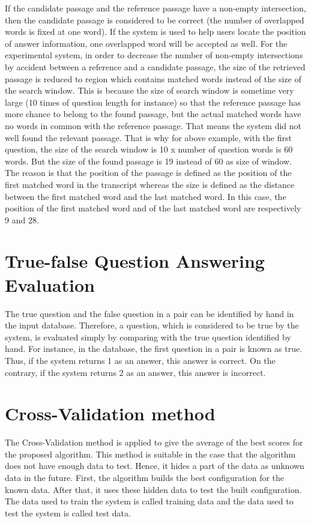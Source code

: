 If the candidate passage and the reference passage have a non-empty intersection, then the candidate passage is considered to be correct (the number of overlapped words is fixed at one word). If the system is used to help users locate the position of answer information, one overlapped word will be accepted as well. For the experimental system, in order to decrease the number of non-empty intersections by accident between a reference and a candidate passage, the size of the retrieved passage is reduced to region which contains matched words instead of the size of the search window. This is because the size of search window is sometime very large (10 times of question length for instance) so that the reference passage has more chance to belong to the found passage, but the actual matched words have no words in common with the reference passage. That means the system did not well found the relevant passage. That is why for above example, with the first question, the size of the search window is 10 x number of question words is 60 words. But the size of the found passage is 19 instead of 60 as size of window. The reason is that the position of the passage is defined as the position of the first matched word in the transcript whereas the size is defined as the distance between the first matched word and the last matched word. In this case, the position of the first matched word and of the last matched word are respectively 9 and 28.


\section{True-false Question Answering Evaluation}

The true question and the false question in a pair can be identified by hand in the input database. Therefore, a question, which is considered to be true by the system, is evaluated simply by comparing with the true question identified by hand. For instance, in the database, the first question in a pair is known as true.  Thus, if the system returns 1 as an answer, this answer is correct. On the contrary, if the system returns 2 as an answer, this answer is incorrect.




\section{Cross-Validation method}
 
 The Cross-Validation method \cite{kohavi1995scv} is applied to give the average of the best scores for the proposed algorithm. This method is suitable in the case that the algorithm does not have enough data to test. Hence, it hides a part of the data as unknown data in the future. First, the algorithm builds the best configuration for the known data. After that, it uses these hidden data to test the built configuration. The data used to train the system is called training data and the data used to test the system is called test data.
 
